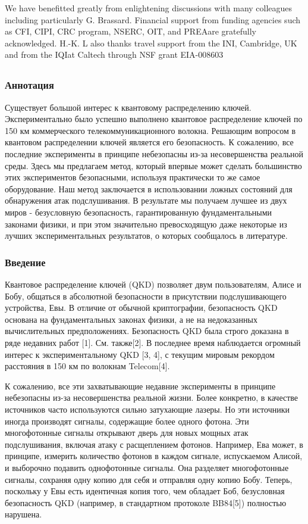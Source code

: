 We have benefitted greatly from enlightening discussions with many colleagues including particularly G. Brassard. Financial support from funding agencies such as CFI, CIPI, CRC program, NSERC, OIT, and PREAare gratefully acknowledged. H.-K. L also thanks travel support from the INI, Cambridge, UK and from the IQIat Caltech through NSF grant EIA-008603

\subsection{\trnas}
\subsubsection*{Аннотация}

Существует большой интерес к квантовому распределению ключей. Экспериментально было успешно выполнено квантовое распределение ключей по 150 км коммерческого телекоммуникационного волокна. Решающим вопросом в квантовом распределении ключей является его безопасность. К сожалению, все последние эксперименты в принципе небезопасны из-за несовершенства реальной среды. Здесь мы предлагаем метод, который впервые может сделать большинство этих экспериментов безопасными, используя практически то же самое оборудование. Наш метод заключается в использовании ложных состояний для обнаружения атак подслушивания. В результате мы получаем лучшее из двух миров - безусловную безопасность, гарантированную фундаментальными законами физики, и при этом значительно превосходящую даже некоторые из лучших экспериментальных результатов, о которых сообщалось в литературе.

\subsubsection{Введение}

Квантовое распределение ключей (QKD) позволяет двум пользователям, Алисе и Бобу, общаться в абсолютной безопасности в присутствии подслушивающего устройства, Евы. В отличие от обычной криптографии, безопасность QKD основана на фундаментальных законах физики, а не на недоказанных вычислительных предположениях. Безопасность QKD была строго доказана в ряде недавних работ [1]. См. также[2]. В последнее время наблюдается огромный интерес к экспериментальному QKD [3, 4], с текущим мировым рекордом расстояния в 150 км по волокнам Telecom[4].

К сожалению, все эти захватывающие недавние эксперименты в принципе небезопасны из-за несовершенства реальной жизни. Более конкретно, в качестве источников часто используются сильно затухающие лазеры. Но эти источники иногда производят сигналы, содержащие более одного фотона. Эти многофотонные сигналы открывают дверь для новых мощных атак подслушивания, включая атаку с расщеплением фотонов. Например, Ева может, в принципе, измерить количество фотонов в каждом сигнале, испускаемом Алисой, и выборочно подавить однофотонные сигналы. Она разделяет многофотонные сигналы, сохраняя одну копию для себя и отправляя одну копию Бобу. Теперь, поскольку у Евы есть идентичная копия того, чем обладает Боб, безусловная безопасность QKD (например, в стандартном протоколе BB84[5]) полностью нарушена.

